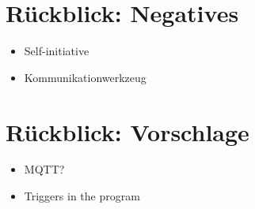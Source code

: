 \documentclass[ignorenonframetext, 11pt, table]{beamer}
\begin{document}
\section*{Rückblick: Negatives}
\begin{frame}
\begin{itemize}
\item Self-initiative\pause
\item Kommunikationwerkzeug
\end{itemize}
\end{frame}


\section*{Rückblick: Vorschlage}
\begin{frame}
\begin{itemize}
\item MQTT?\pause
\item Triggers in the program
\end{itemize}
\end{frame}
\end{document}
